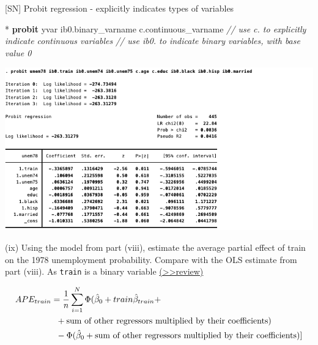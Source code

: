 \documentclass[
  10pt,
  ignorenonframetext,
]{beamer}
\newenvironment{Shaded}{\begin{snugshade}}{\end{snugshade}}
\newcommand{\CommentTok}[1]{\textcolor[rgb]{0.56,0.35,0.01}{\textit{#1}}}
\newcommand{\KeywordTok}[1]{\textcolor[rgb]{0.13,0.29,0.53}{\textbf{#1}}}
\newcommand{\NormalTok}[1]{#1}
\begin{document}
\begin{frame}[fragile]{{[}SN{]} Probit regression - explicitly indicates
types of variables}
\protect\hypertarget{sn-probit-regression---explicitly-indicates-types-of-variables}{}
\footnotesize

\begin{Shaded}
\begin{Highlighting}[]
\NormalTok{* }\KeywordTok{probit}\NormalTok{ yvar ib0.binary\_varname c.continuous\_varname}
\CommentTok{// use \textquotesingle{}c.\textquotesingle{} to explicitly indicate continuous variables}
\CommentTok{// use \textquotesingle{}ib0.\textquotesingle{} to indicate binary variables, with base value 0}
\end{Highlighting}
\end{Shaded}

\begin{center}\includegraphics[width=1\linewidth]{pictures/PROBITfullform} \end{center}
\end{frame}

\begin{frame}[fragile]{(ix) Using the model from part (viii), estimate
the average partial effect of train on the 1978 unemployment
probability. Compare with the OLS estimate from part (viii).}
\protect\hypertarget{Ex1-ix}{}
As \texttt{train} is a binary variable
\footnotesize \protect\hyperlink{APEcalculation}{(\textgreater\textgreater review)}
\small

\[
\begin{aligned}
APE_{train} &= \frac{1}{n} \sum_{i=1}^{N} \Phi (\hat{\beta}_0 + train \hat\beta_{train} + \\
&\hspace{2mm}+  \text{sum of other regressors multiplied by their coefficients}) \\
&\hspace{2mm}- \Phi (\hat{\beta}_0 +  \text{sum of other regressors multiplied by their coefficients} ) ]
\end{aligned}
\]
\end{frame}
\end{document}
